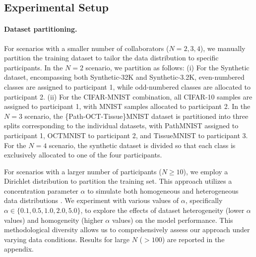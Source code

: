 \documentclass{article}
\begin{document}
\subsection{Experimental Setup} 
\label{subsection: exp-setup}

\paragraph{Dataset partitioning.} For scenarios with a smaller number of collaborators ($N={2, 3, 4}$), we manually partition the training dataset to tailor the data distribution to specific participants. In the $N=2$ scenario, we partition as follows: (i) For the Synthetic dataset, encompassing both Synthetic-32K and Synthetic-3.2K, even-numbered classes are assigned to participant 1, while odd-numbered classes are allocated to participant 2. (ii) For the CIFAR-MNIST combination, all CIFAR-10 samples are assigned to participant 1, with MNIST samples allocated to participant 2. In the $N=3$ scenario, the \{Path-OCT-Tissue\}MNIST dataset is partitioned into three splits corresponding to the individual datasets, with PathMNIST assigned to participant 1, OCTMNIST to participant 2, and TissueMNIST to participant 3. For the $N=4$ scenario, the synthetic dataset is divided so that each class is exclusively allocated to one of the four participants. 

For scenarios with a larger number of participants ($N \geq 10$), we employ a Dirichlet distribution to partition the training set. This approach utilizes a concentration parameter $\alpha$ to simulate both homogeneous and heterogeneous data distributions \citep{yurochkin2019bayesian, li2020practical, lin2020ensemble, wang2020federated}. We experiment with various values of $\alpha$, specifically $\alpha \in \{0.1, 0.5, 1.0, 2.0, 5.0\}$, to explore the effects of dataset heterogeneity (lower $\alpha$ values) and homogeneity (higher $\alpha$ values) on the model performance. This methodological diversity allows us to comprehensively assess our approach under varying data conditions. Results for large $N$ ($> 100$) are reported in the appendix.  
\end{document}
